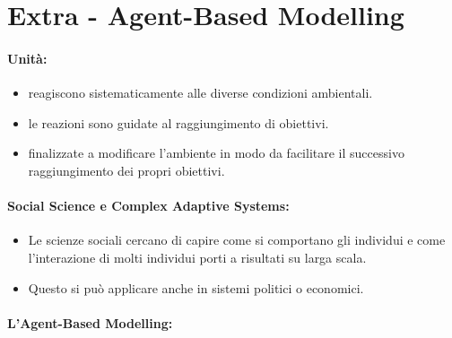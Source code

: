 \section{Extra - Agent-Based Modelling}


\paragraph{Unità:}

\begin{itemize}
  \item {} reagiscono sistematicamente alle diverse condizioni ambientali. 
  \item {} le reazioni sono guidate al raggiungimento di obiettivi. 
  \item {} finalizzate a modificare l'ambiente in modo da facilitare il successivo raggiungimento dei propri obiettivi. 
 \end{itemize}

 \paragraph{Social Science e Complex Adaptive Systems:}

 \begin{itemize}
   \item Le scienze sociali cercano di capire come si comportano gli individui e come l'interazione di molti individui porti a risultati su larga scala. 
   \item Questo si può applicare anche in sistemi politici o economici.
 \end{itemize}

 \paragraph{L'Agent-Based Modelling:}

